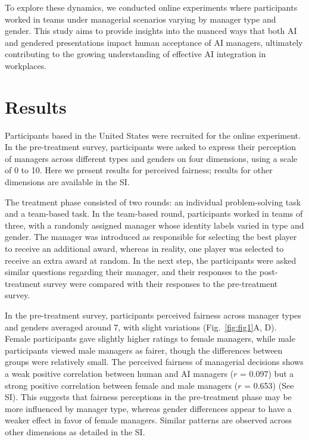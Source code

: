 \documentclass{article}
\begin{document}
To explore these dynamics, we conducted online experiments where participants worked in teams under managerial scenarios varying by manager type and gender. This study aims to provide insights into the nuanced ways that both AI and gendered presentations impact human acceptance of AI managers, ultimately contributing to the growing understanding of effective AI integration in workplaces. 


\section*{Results}

Participants based in the United States were recruited for the online experiment. In the pre-treatment survey, participants were asked to express their perception of managers across different types and genders on four dimensions, using a scale of 0 to 10. Here we present results for perceived fairness; results for other dimensions are available in the SI. 

The treatment phase consisted of two rounds: an individual problem-solving task and a team-based task. In the team-based round, participants worked in teams of three, with a randomly assigned manager whose identity labels varied in type and gender. The manager was introduced as responsible for selecting the best player to receive an additional award, whereas in reality, one player was selected to receive an extra award at random. In the next step, the participants were asked similar questions regarding their manager, and their responses to the post-treatment survey were compared with their responses to the pre-treatment survey. 

In the pre-treatment survey, participants perceived fairness across manager types and genders averaged around 7, with slight variations (Fig.~\ref{fig:fig1}A, D). 
Female participants gave slightly higher ratings to female managers, while male participants viewed male managers as fairer, 
though the differences between groups were relatively small.
The perceived fairness of managerial decisions shows a weak positive correlation between human and AI managers ($r$ = 0.097) but a strong positive correlation between female and male managers ($r$ = 0.653) (See SI).
This suggests that fairness perceptions in the pre-treatment phase may be more influenced by manager type, whereas gender differences appear to have a weaker effect in favor of female managers.
Similar patterns are observed across other dimensions as detailed in the SI.
\end{document}
